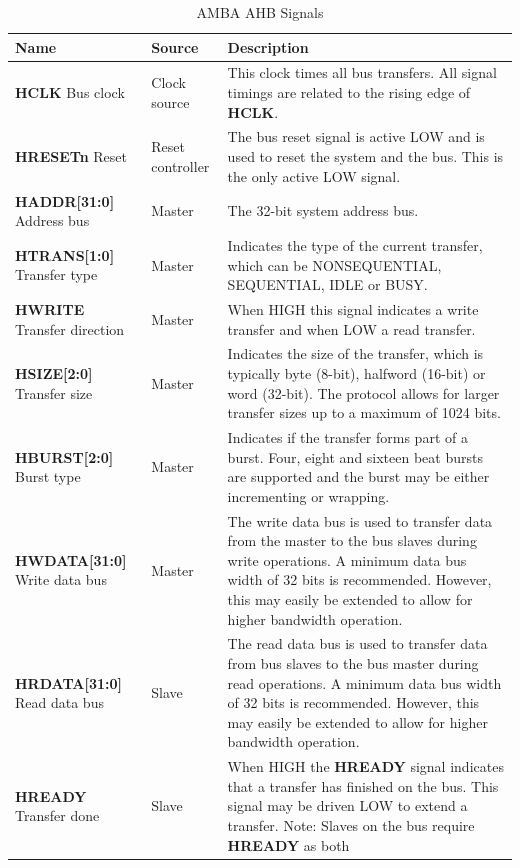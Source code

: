 \documentclass[a4paper,10pt]{article}
\numberwithin{figure}{section}
\numberwithin{table}{section}
\begin{document}
\begin{center}
\begin{longtable}{p{1.5 cm} l p{6 cm}}
\caption{AMBA AHB Signals}\\\hline
\rowcolor{tcA}
Name & Source & Description\\\hline
{\bf HCLK}
Bus clock & Clock source & This clock times all bus transfers. All signal
timings are related to the rising edge of {\bf HCLK}.\\\hline
{\bf HRESETn}
Reset & Reset controller & The bus reset signal is active LOW and is used to
reset the system and the bus. This is the only active
LOW signal.\\\hline
{\bf HADDR[31:0]}
Address bus & Master & The 32-bit system address bus.\\\hline
{\bf HTRANS[1:0]}
Transfer type & Master & Indicates the type of the current transfer, which can
be NONSEQUENTIAL, SEQUENTIAL, IDLE or
BUSY.\\\hline
{\bf HWRITE}
Transfer direction & Master & When HIGH this signal indicates a write transfer
and when LOW a read transfer.\\\hline
{\bf HSIZE[2:0]}
Transfer size & Master & Indicates the size of the transfer, which is typically
byte (8-bit), halfword (16-bit) or word (32-bit). The
protocol allows for larger transfer sizes up to a
maximum of 1024 bits.\\\hline
{\bf HBURST[2:0]}
Burst type & Master & Indicates if the transfer forms part of a burst. Four,
eight and sixteen beat bursts are supported and the
burst may be either incrementing or wrapping.\\\hline
{\bf HWDATA[31:0]}
Write data bus & Master & The write data bus is used to transfer data from the
master to the bus slaves during write operations. A
minimum data bus width of 32 bits is
recommended. However, this may easily be
extended to allow for higher bandwidth operation.\\\hline
{\bf HRDATA[31:0]}
Read data bus & Slave & The read data bus is used to transfer data from bus
slaves to the bus master during read operations. A
minimum data bus width of 32 bits is
recommended. However, this may easily be
extended to allow for higher bandwidth operation.\\\hline
{\bf HREADY}
Transfer done & Slave & When HIGH the {\bf HREADY} signal indicates that a
transfer has finished on the bus. This signal may be
driven LOW to extend a transfer.
Note: Slaves on the bus require {\bf HREADY} as both

\end{longtable}
\end{center}
\end{document}
